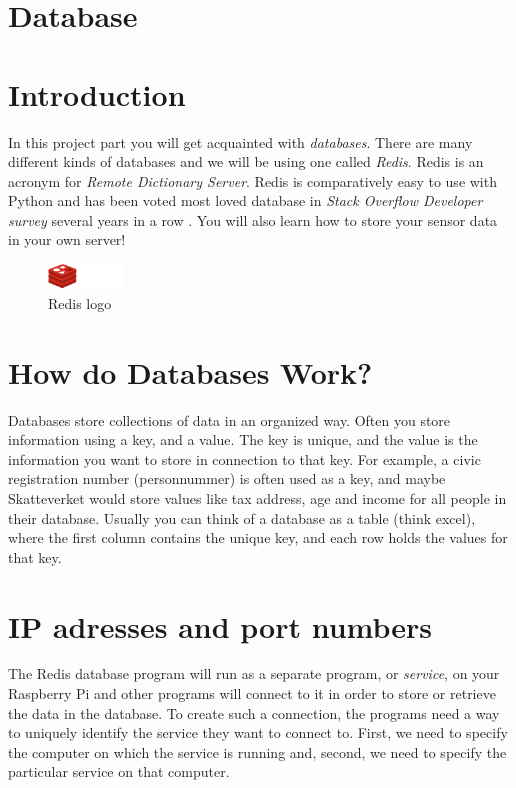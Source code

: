 \documentclass{article}
\begin{document}
\section*{\huge{Database}}
\section{Introduction}
\noindent In this project part you will get acquainted with \emph{databases}. There are many different kinds of databases and we will be using one called \emph{Redis}. Redis is an acronym for \emph{Remote Dictionary Server}. Redis is comparatively easy to use with Python and has been voted most loved database in \emph{Stack Overflow Developer survey} several years in a row \cite{loved}. You will also learn how to store your sensor data in your own server!
\begin{figure}[h]
    \centering
    \includegraphics[width=20mm, trim={0 0 4.8cm 0},clip]{redis-white.png}
    \caption{Redis logo}
    \label{fig:logo}
\end{figure}
\section{How do Databases Work?}
Databases store collections of data in an organized way. Often you store information using a key, and a value. The key is unique, and the value is the information you want to store in connection to that key. For example, a civic registration number (personnummer) is often used as a key, and maybe Skatteverket would store values like tax address, age and income for all people in their database. Usually you can think of a database as a table (think excel), where the first column contains the unique key, and each row holds the values for that key.

\section{IP adresses and port numbers}

The Redis database program will run as a separate program, or \emph{service}, on your Raspberry Pi and other programs will connect to it in order to store or retrieve the data in the database. To create such a connection, the programs need a way to uniquely identify the service they want to connect to. First, we need to specify the computer on which the service is running and, second, we need to specify the particular service on that computer.
\end{document}
